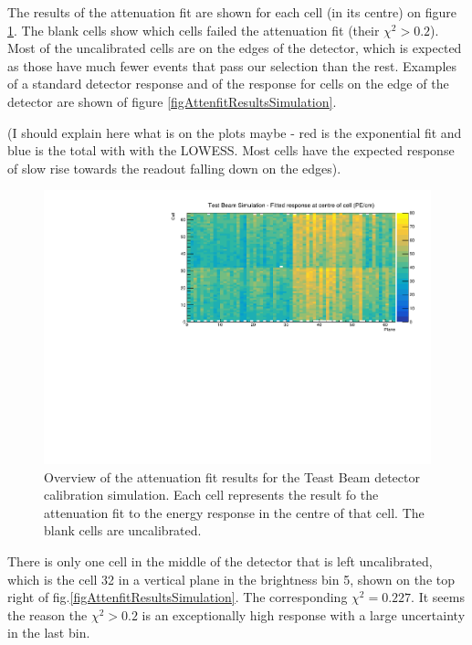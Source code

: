 \documentclass[12pt,a4paper]{article}
\begin{document}
The results of the attenuation fit are shown for each cell (in its centre) on figure \ref{figCellCentreResponseSim}. The blank cells show which cells failed the attenuation fit (their $\chi^2>0.2$). Most of the uncalibrated cells are on the edges of the detector, which is expected as those have much fewer events that pass our selection than the rest. Examples of a standard detector response and of the response for cells on the edge of the detector are shown of figure \ref{figAttenfitResultsSimulation}.

(I should explain here what is on the plots maybe - red is the exponential fit and blue is the total with with the LOWESS. Most cells have the expected response of slow rise towards the readout falling down on the edges).

\begin{figure}[h]
\centering
\includegraphics[width=\textwidth]{Plots/CellResponseAtCentre_Prod4DataBasedSim_Limited.pdf}
\caption{Overview of the attenuation fit results for the Teast Beam detector calibration simulation. Each cell represents the result fo the attenuation fit to the energy response in the centre of that cell. The blank cells are uncalibrated.}
\label{figCellCentreResponseSim}
\end{figure}

There is only one cell in the middle of the detector that is left uncalibrated, which is the cell 32 in a vertical plane in the brightness bin 5, shown on the top right of fig.\ref{figAttenfitResultsSimulation}. The corresponding $\chi^2=0.227$. It seems the reason the $\chi^2>0.2$ is an exceptionally high response with a large uncertainty in the last bin.
\end{document}
